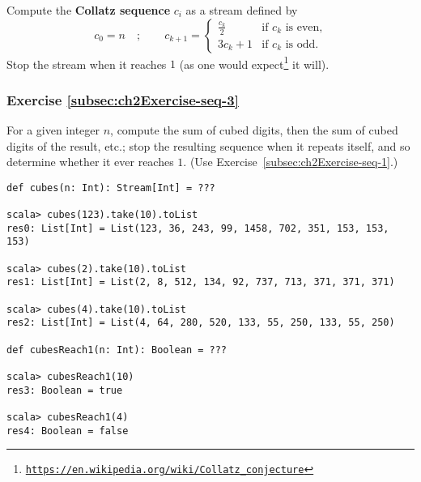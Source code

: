 Compute the \textbf{Collatz sequence} $c_{i}$
as a stream defined by
\[
c_{0}=n\quad;\quad\quad c_{k+1}=\begin{cases}
\frac{c_{k}}{2} & \text{if }c_{k}\text{ is even,}\\
3c_{k}+1 & \text{if }c_{k}\text{ is odd.}
\end{cases}
\]
Stop the stream when it reaches $1$ (as one would expect\footnote{\texttt{\href{https://en.wikipedia.org/wiki/Collatz_conjecture}{https://en.wikipedia.org/wiki/Collatz\_conjecture}}}
it will).

\subsubsection{Exercise \label{subsec:ch2Exercise-seq-3}\ref{subsec:ch2Exercise-seq-3}}

For a given integer $n$, compute the sum of cubed digits, then the
sum of cubed digits of the result, etc.; stop the resulting sequence
when it repeats itself, and so determine whether it ever reaches $1$.
(Use Exercise~\ref{subsec:ch2Exercise-seq-1}.)
\begin{lstlisting}
def cubes(n: Int): Stream[Int] = ???

scala> cubes(123).take(10).toList
res0: List[Int] = List(123, 36, 243, 99, 1458, 702, 351, 153, 153, 153)

scala> cubes(2).take(10).toList
res1: List[Int] = List(2, 8, 512, 134, 92, 737, 713, 371, 371, 371)

scala> cubes(4).take(10).toList
res2: List[Int] = List(4, 64, 280, 520, 133, 55, 250, 133, 55, 250)

def cubesReach1(n: Int): Boolean = ???

scala> cubesReach1(10)
res3: Boolean = true

scala> cubesReach1(4)
res4: Boolean = false
\end{lstlisting}
\begin{comment}
Solution:
\begin{lstlisting}
def digitsOf(n: Int): Seq[Int] = Stream.iterate(n)(_ / 10).takeWhile(_ != 0).map(_ % 10).toList
def cubeDigits(n: Int): Int = digitsOf(n).map(x => x*x*x).sum
def cubes(n: Int): Stream[Int] = Stream.iterate(n)(cubeDigits)
def stopRepeats[T](str: Stream[T]): Stream[T] = {
  val halfSpeed = str.flatMap(x => Seq(x, x))
  val result = halfSpeed.zip(str).drop(1).takeWhile{ case (h, s) => h != s }.map(_._2)
  if (result.isEmpty) str.take(1) else str
}
def cubesReach1(n: Int): Boolean = stopRepeats(cubes(n)).contains(1)
\end{lstlisting}
\end{comment}


